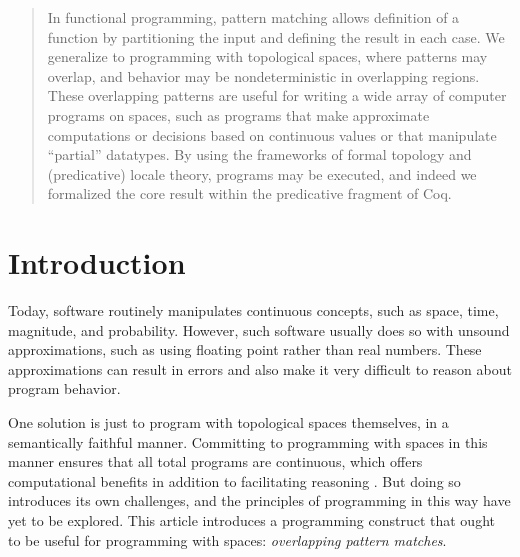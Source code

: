 \documentclass[conference]{IEEEtran}
\begin{document}
\begin{abstract}
In functional programming, pattern matching allows definition of a function by partitioning the input and defining the result in each case. We generalize to programming with topological spaces, where patterns may overlap, and behavior may be nondeterministic in overlapping regions. These overlapping patterns are useful for writing a wide array of computer programs on spaces, such as programs that make approximate computations or decisions based on continuous values or that manipulate ``partial'' datatypes. By using the frameworks of formal topology and (predicative) locale theory, programs may be executed, and indeed we formalized the core result within the predicative fragment of Coq.
\end{abstract}





%
\IEEEpeerreviewmaketitle


\section{Introduction}

Today, software routinely manipulates continuous concepts, such as space, time, magnitude, and probability. However, such software usually does so with unsound approximations, such as using floating point rather than real numbers. These approximations can result in errors and also make it very difficult to reason about program behavior.

One solution is just to program with topological spaces themselves, in a semantically faithful manner. Committing to programming with spaces in this manner ensures that all total programs are continuous, which offers computational benefits in addition to facilitating reasoning \cite{lamcra}. But doing so introduces its own challenges, and the principles of programming in this way have yet to be explored. This article introduces a programming construct that ought to be useful for programming with spaces: \emph{overlapping pattern matches}.
\end{document}
